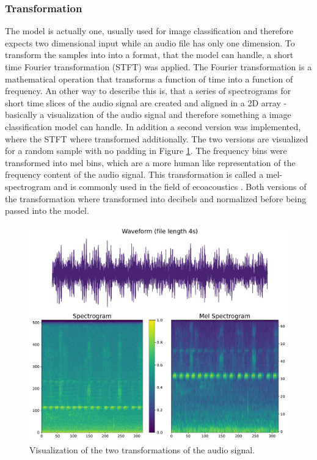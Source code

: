 \subsubsection{Transformation}%
The model is actually one, usually used for image classification and therefore expects
two dimensional input while an audio file has only one dimension. To transform the samples into
into a format, that the model can handle, a short time Fourier transformation  (STFT) was applied.
The Fourier transformation is a mathematical operation that transforms a function of time
into a function of frequency. An other way to describe this is, that a series of spectrograms
for short time slices of the audio signal are created and aligned in a 2D array - basically
a visualization of the audio signal and therefore something a image classification model can handle.
In addition a second version was implemented, where the STFT where transformed additionally.
The two versions are visualized for a random sample with no padding in Figure \ref{fig:compare_spectrogram}.
The frequency bins were transformed into mel bins, which are a more human like representation
of the frequency content of the audio signal. This transformation is called a mel-spectrogram
and is commonly used in the field of ecoacoustics \autocite[7]{stowellComputationalBioacousticsDeep2022}.
Both versions of the transformation where transformed into decibels and normalized before 
being passed into the model.

\begin{figure}[h]
    \centering
    \captionsetup{width=7\linewidth}
    \includegraphics[width=1\textwidth]{figures/compare_spectrogram.pdf}
    \caption{Visualization of the two transformations of the audio signal.}
    \label{fig:compare_spectrogram}
\end{figure}

